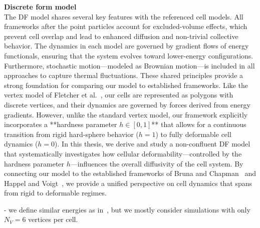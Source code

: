 \textbf{Discrete form model} \\ 
The DF model shares several key features with the referenced cell models. 
All frameworks after the point particles account for excluded-volume effects, which prevent cell overlap and lead to enhanced diffusion and non-trivial collective behavior. 
The dynamics in each model are governed by gradient flows of energy functionals, ensuring that the system evolves toward lower-energy configurations. 
Furthermore, stochastic motion—modeled as Brownian motion—is included in all approaches to capture thermal fluctuations. 
These shared principles provide a strong foundation for comparing our model to established frameworks.
Like the vertex model of Fletcher et al.~\cite{Fletcher14}, our cells are represented as polygons with discrete vertices, and their dynamics are governed by forces derived from energy gradients. 
However, unlike the standard vertex model, our framework explicitly incorporates a **hardness parameter $h \in [0,1]$** that allows for a continuous transition from rigid hard-sphere behavior ($h=1$) to fully deformable cell dynamics ($h=0$).
In this thesis, we derive and study a non-confluent DF model that systematically investigates how cellular deformability—controlled by the hardness parameter $h$—influences the overall diffusivity of the cell system. 
By connecting our model to the established frameworks of Bruna and Chapman~\cite{Bruna2012, Bruna2017} and Happel and Voigt~\cite{Happel2023}, we provide a unified perspective on cell dynamics that spans from rigid to deformable regimes.

- we define similar energies as in~\cite{Fletcher14}, but we mostly consider simulations with only $N_V=6$ vertices per cell.  


